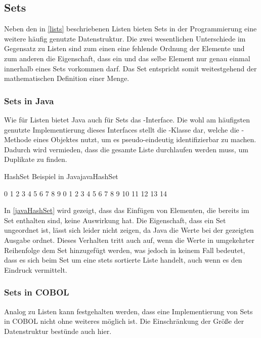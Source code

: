 \subsection{Sets}
Neben den in \autoref{lists} beschriebenen Listen bieten Sets in der Programmierung eine weitere häufig genutzte Datenstruktur. Die zwei wesentlichen Unterschiede im Gegensatz zu Listen sind zum einen eine fehlende Ordnung der Elemente und zum anderen die Eigenschaft, dass ein und das selbe Element nur genau einmal innerhalb eines Sets vorkommen darf. Das Set entspricht somit weitestgehend der mathematischen Definition einer Menge.

\subsubsection*{Sets in Java}
Wie für Listen bietet Java auch für Sets das -Interface. Die wohl am häufigsten genutzte Implementierung dieses Interfaces stellt die -Klasse dar, welche die -Methode eines Objektes nutzt, um es pseudo-eindeutig identifizierbar zu machen. Dadurch wird vermieden, dass die gesamte Liste durchlaufen werden muss, um Duplikate zu finden.

\begin{codeWithCaption}{HashSet Beispiel in Java}{javaHashSet}
\begin{shellwindow}
0 1 2 3 4 5 6 7 8 9 
0 1 2 3 4 5 6 7 8 9 10 11 12 13 14 
\end{shellwindow}
\end{codeWithCaption}

In \autoref{javaHashSet} wird gezeigt, dass das Einfügen von Elementen, die bereits im Set enthalten sind, keine Auswirkung hat. Die Eigenschaft, dass ein Set ungeordnet ist, lässt sich leider nicht zeigen, da Java die Werte bei der gezeigten Ausgabe ordnet. Dieses Verhalten tritt auch auf, wenn die Werte in umgekehrter Reihenfolge dem Set hinzugefügt werden, was jedoch in keinem Fall bedeutet, dass es sich beim Set um eine stets sortierte Liste handelt, auch wenn es den Eindruck vermittelt.

\subsubsection*{Sets in COBOL}
Analog zu Listen kann festgehalten werden, dass eine Implementierung von Sets in COBOL nicht ohne weiteres möglich ist. Die Einschränkung der Größe der Datenstruktur bestünde auch hier. 

